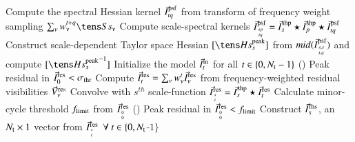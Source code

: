 \documentclass[11pt,a4paper]{article}
\begin{document}
\begin{algorithm}
  {
{\color{red}        { Compute the spectral Hessian kernel $\vec{I}^{\rm psf}_{tq}$ from transform of frequency weight sampling } $\sum_{\nu} \wntq \Sa_{\nu}$\;}
	{
		{Compute scale-spectral kernels} $\vec{I}^{\rm psf}_{{sp}\atop{tq}} = \vec{I}^{\rm shp}_s \star \vec{I}^{\rm shp}_p \star \vec{I}^{\rm psf}_{tq} $\;
	}
  }
  {
     Construct scale-dependent Taylor space Hessian $[{\He^{\rm peak}_s}]$ from $mid({\vec{I}}^{\rm psf}_{{s,s}\atop{t,q}})$ and compute $[{\He^{\rm peak}_s}^{-1}]$\;
  }
  Initialize the model $\vec{I}^{\rm m}_t$ for all $t \in \{0,N_{\rm t} -1\}$\; %
  \Repeat () { Peak residual in $\vec{I}^{\rm res}_0 < \sigma_{\rm thr}$ }
  {
    {
{\color{red}      Compute $\vec{I}^{\rm res}_t = \sum_{\nu} {w_{\nu}^t} \vec{I}^{\rm res}_{\nu}$ from frequency-weighted residual visibilities $\vec{V}^{\rm res}_{\nu}$\;}
      {
	    Convolve with $s^{th}$ scale-function $\vec{I}^{\rm res}_{{s}\atop{t}} = \vec{I}^{\rm shp}_s \star \vec{I}^{\rm res}_t$
      }
    }
    Calculate minor-cycle threshold $f_{\rm limit}$ from $\vec{I}^{\rm res}_{{0}\atop{0}}$\;
    \Repeat (){ Peak residual in $\vec{I}^{\rm res}_{{0}\atop{0}} < f_{\rm limit} $ } 
    {
     {
       {
          Construct ${\vec{I}}^{\rm rhs}_s$, an $N_{\rm t} \times 1$ vector from ${\vec{I}}^{\rm res}_{{s}\atop{t}} ~~\forall ~ t \in \{0,N_{\rm t} $-$1\}$\;
}}}}
\end{algorithm}
\end{document}
